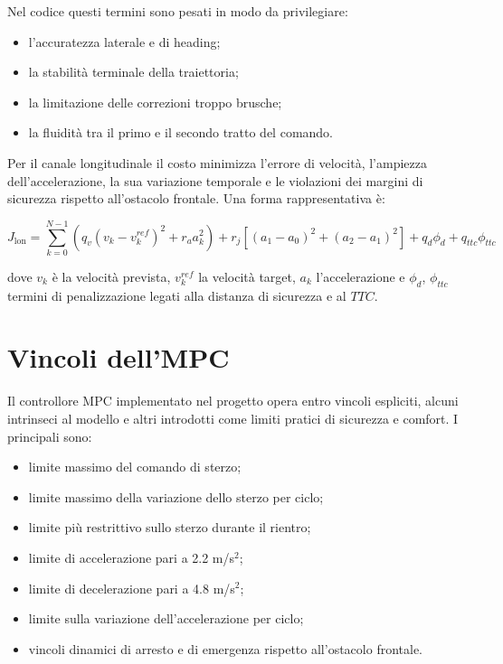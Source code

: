 Nel codice questi termini sono pesati in modo da privilegiare:

\begin{itemize}
    \item l'accuratezza laterale e di heading;
    \item la stabilità terminale della traiettoria;
    \item la limitazione delle correzioni troppo brusche;
    \item la fluidità tra il primo e il secondo tratto del comando.
\end{itemize}

Per il canale longitudinale il costo minimizza l'errore di velocità, l'ampiezza dell'accelerazione, la sua variazione temporale e le violazioni dei margini di sicurezza rispetto all'ostacolo frontale. Una forma rappresentativa è:

\[
J_{\text{lon}} =
\sum_{k=0}^{N-1}
\left(
q_v (v_k - v_k^{ref})^2 +
r_a a_k^2
\right)
+
r_j \left[(a_1-a_0)^2 + (a_2-a_1)^2\right]
+
q_d \phi_d +
q_{ttc}\phi_{ttc}
\]

dove \(v_k\) è la velocità prevista, \(v_k^{ref}\) la velocità target, \(a_k\) l'accelerazione e \(\phi_d\), \(\phi_{ttc}\) termini di penalizzazione legati alla distanza di sicurezza e al \(TTC\).

\section{Vincoli dell'MPC}

Il controllore MPC implementato nel progetto opera entro vincoli espliciti, alcuni intrinseci al modello e altri introdotti come limiti pratici di sicurezza e comfort. I principali sono:

\begin{itemize}
    \item limite massimo del comando di sterzo;
    \item limite massimo della variazione dello sterzo per ciclo;
    \item limite più restrittivo sullo sterzo durante il rientro;
    \item limite di accelerazione pari a 2.2 m/s\(^2\);
    \item limite di decelerazione pari a 4.8 m/s\(^2\);
    \item limite sulla variazione dell'accelerazione per ciclo;
    \item vincoli dinamici di arresto e di emergenza rispetto all'ostacolo frontale.
\end{itemize}

